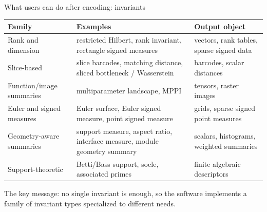 \documentclass[aspectratio=169,11pt]{beamer}
\begin{document}
\begin{frame}{What users can do after encoding: invariants}
\small
\renewcommand{\arraystretch}{1.15}
\begin{tabular}{p{} p{} p{}}
\toprule
Family & Examples & Output object \\
\midrule
Rank and dimension & restricted Hilbert, rank invariant, rectangle signed measures & vectors, rank tables, sparse signed data \\
Slice-based & slice barcodes, matching distance, sliced bottleneck / Wasserstein & barcodes, scalar distances \\
Function/image summaries & multiparameter landscape, MPPI & tensors, raster images \\
Euler and signed measures & Euler surface, Euler signed measure, point signed measure & grids, sparse signed point measures \\
Geometry-aware summaries & support measure, aspect ratio, interface measure, module geometry summary & scalars, histograms, weighted summaries \\
Support-theoretic & Betti/Bass support, socle, associated primes & finite algebraic descriptors \\
\bottomrule
\end{tabular}

\medskip
\raggedright
The key message: no single invariant is enough, so the software implements a family of invariant types specialized to different needs.
\end{frame}
\end{document}
